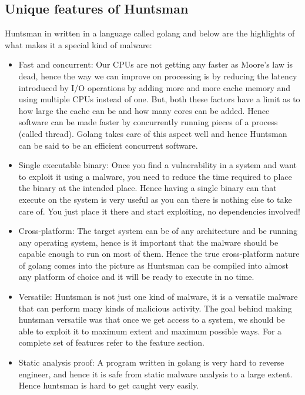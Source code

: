 \documentclass[12pt]{article}
\begin{document}
\subsection{Unique features of Huntsman}
Huntsman in written in a language called golang and below are the highlights of what makes it a special kind of malware:  
\begin{itemize}
	\item Fast and concurrent: Our CPUs are not getting any faster as Moore’s law is dead, hence the way we can improve on processing is by reducing the latency introduced by I/O operations by adding more and more cache memory and using multiple CPUs instead of one. But, both these factors have a limit as to how large the cache can be and how many cores can be added. Hence software can be made faster by concurrently running pieces of a process (called thread). Golang takes care of this aspect well and hence Huntsman can be said to be an efficient concurrent software.  

	\item Single executable binary: Once you find a vulnerability in a system and want to exploit it using a malware, you need to reduce the time required to place the binary at the intended place. Hence having a single binary can that execute on the system is very useful as you can there is nothing else to take care of. You just place it there and start exploiting, no dependencies involved!

	\item Cross-platform: The target system can be of any architecture and be running any operating system, hence is it important that the malware should be capable enough to run on most of them. Hence the true cross-platform nature of golang comes into the picture as Huntsman can be compiled into almost any platform of choice and it will be ready to execute in no time.

	\item Versatile: Huntsman is not just one kind of malware, it is a versatile malware that can perform many kinds of malicious activity. The goal behind making huntsman versatile was that once we get access to a system, we should be able to exploit it to maximum extent and maximum possible ways. For a complete set of features refer to the feature section.

	\item Static analysis proof: A program written in golang is very hard to reverse engineer, and hence it is safe from static malware analysis to a large extent. Hence huntsman is hard to get caught very easily.  
\end{itemize}
\end{document}
